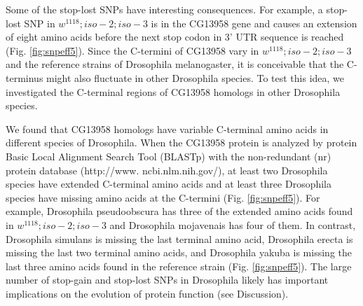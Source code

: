 
Some of the stop-lost SNPs have interesting consequences. For example, a stop-lost SNP in $w^{1118} ; iso-2; iso-3$ is in the CG13958 gene and causes an extension of eight amino acids before the next stop codon in 3' UTR sequence is reached (Fig. \ref{fig:snpeff5}). Since the C-termini of CG13958 vary in $w^{1118} ; iso-2; iso-3$ and the reference strains of Drosophila melanogaster, it is conceivable that the C-terminus might also fluctuate in other Drosophila species. To test this idea, we investigated the C-terminal regions of CG13958 homologs in other Drosophila species.


We found that CG13958 homologs have variable C-terminal amino acids in different species of Drosophila. When the CG13958 protein is analyzed by protein Basic Local Alignment Search Tool (BLASTp) with the non-redundant (nr) protein database (http://www. ncbi.nlm.nih.gov/), at least two Drosophila species have extended C-terminal amino acids and at least three Drosophila species have missing amino acids at the C-termini (Fig. \ref{fig:snpeff5}). For example, Drosophila pseudoobscura has three of the extended amino acids found in $w^{1118} ; iso-2; iso-3$ and Drosophila mojavenais has four of them. In contrast, Drosophila simulans is missing the last terminal amino acid, Drosophila erecta is missing the last two terminal amino acids, and Drosophila yakuba is missing the last three amino acids found in the reference strain (Fig. \ref{fig:snpeff5}). The large number of stop-gain and stop-lost SNPs in Drosophila likely has important implications on the evolution of protein function (see Discussion).


